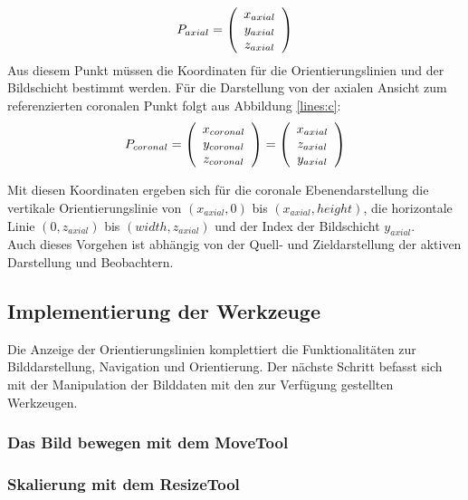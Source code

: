 \begin{equation}
P_{axial}=\left(\begin{array}{c} x_{axial} \\ y_{axial} \\ z_{axial} \end{array}\right) 
\vspace{0.5cm}
\end{equation}
Aus diesem Punkt müssen die Koordinaten für die Orientierungslinien und der Bildschicht bestimmt werden.
Für die Darstellung von der axialen Ansicht zum referenzierten coronalen Punkt folgt aus Abbildung \ref{lines:c}:
\begin{equation}
P_{coronal}=\left(\begin{array}{c} x_{coronal} \\ y_{coronal} \\ z_{coronal} \end{array}\right) =
\left(\begin{array}{c} x_{axial} \\ z_{axial} \\ y_{axial} \end{array}\right)
\vspace{0.5cm}
\end{equation}

Mit diesen Koordinaten ergeben sich für die coronale Ebenendarstellung die vertikale Orientierungslinie von $(x_{axial}, 0)$ bis $(x_{axial}, height)$, die horizontale Linie $(0, z_{axial})$ bis $(width, z_{axial})$ und der Index der Bildschicht $y_{axial}$.\\
Auch dieses Vorgehen ist abhängig von der Quell- und Zieldarstellung der aktiven Darstellung und Beobachtern.

\subsection{Implementierung der Werkzeuge}

Die Anzeige der Orientierungslinien komplettiert die Funktionalitäten zur Bilddarstellung, Navigation und Orientierung. Der nächste Schritt befasst sich mit der Manipulation der Bilddaten mit den zur Verfügung gestellten Werkzeugen.

\subsubsection{Das Bild bewegen mit dem MoveTool}

\subsubsection{Skalierung mit dem ResizeTool}

